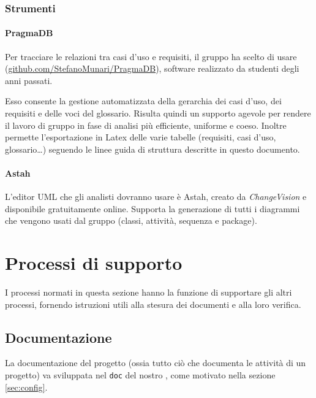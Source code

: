 	\subsubsection{Strumenti}
		\paragraph{PragmaDB}
		Per tracciare le relazioni tra casi d'uso e requisiti, il gruppo ha scelto di usare  (\url{github.com/StefanoMunari/PragmaDB}), software realizzato da studenti degli anni passati.
		
		Esso consente la gestione automatizzata della gerarchia dei casi d'uso, dei requisiti e delle voci del glossario. Risulta quindi un supporto agevole per rendere il lavoro di gruppo in fase di analisi più efficiente, uniforme e coeso. Inoltre permette l'esportazione in Latex delle varie tabelle (requisiti, casi d'uso, glossario\dots) seguendo le linee guida di struttura descritte in questo documento.

		\paragraph{Astah}
		L'editor UML che gli analisti dovranno usare è Astah, creato da \emph{ChangeVision} e disponibile gratuitamente online. Supporta la generazione di tutti i diagrammi che vengono usati dal gruppo (classi, attività, sequenza e package).





\section{Processi di supporto} \label{sec:supporto}
I processi normati in questa sezione hanno la funzione di supportare gli altri processi, fornendo istruzioni utili alla stesura dei documenti e alla loro verifica.

\subsection{Documentazione} \label{sec:doc}
La documentazione del progetto (ossia tutto ciò che documenta le attività di un progetto) va sviluppata nel  \texttt{doc} del nostro , come motivato nella sezione \ref{sec:config}.

